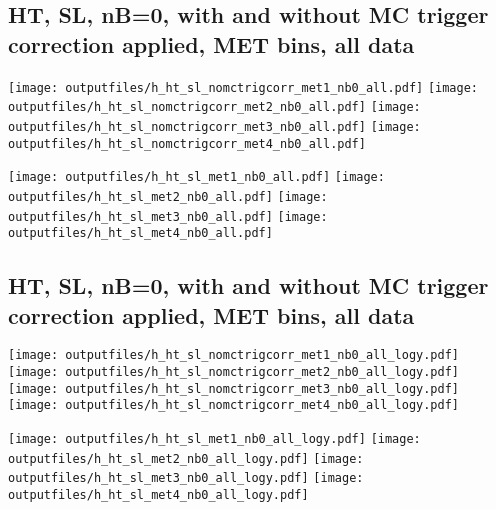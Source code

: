 \documentclass[11pt]{article}
\begin{document}
   \clearpage
     \subsection{ HT, SL, nB=0, with and without MC trigger correction applied, MET bins, all data}

    \noindent
     \texttt{[image: outputfiles/h\_ht\_sl\_nomctrigcorr\_met1\_nb0\_all.pdf]}
     \texttt{[image: outputfiles/h\_ht\_sl\_nomctrigcorr\_met2\_nb0\_all.pdf]}
     \texttt{[image: outputfiles/h\_ht\_sl\_nomctrigcorr\_met3\_nb0\_all.pdf]}
     \texttt{[image: outputfiles/h\_ht\_sl\_nomctrigcorr\_met4\_nb0\_all.pdf]}

    \noindent
     \texttt{[image: outputfiles/h\_ht\_sl\_met1\_nb0\_all.pdf]}
     \texttt{[image: outputfiles/h\_ht\_sl\_met2\_nb0\_all.pdf]}
     \texttt{[image: outputfiles/h\_ht\_sl\_met3\_nb0\_all.pdf]}
     \texttt{[image: outputfiles/h\_ht\_sl\_met4\_nb0\_all.pdf]}

   \clearpage
     \subsection{ HT, SL, nB=0, with and without MC trigger correction applied, MET bins, all data}

    \noindent
     \texttt{[image: outputfiles/h\_ht\_sl\_nomctrigcorr\_met1\_nb0\_all\_logy.pdf]}
     \texttt{[image: outputfiles/h\_ht\_sl\_nomctrigcorr\_met2\_nb0\_all\_logy.pdf]}
     \texttt{[image: outputfiles/h\_ht\_sl\_nomctrigcorr\_met3\_nb0\_all\_logy.pdf]}
     \texttt{[image: outputfiles/h\_ht\_sl\_nomctrigcorr\_met4\_nb0\_all\_logy.pdf]}

    \noindent
     \texttt{[image: outputfiles/h\_ht\_sl\_met1\_nb0\_all\_logy.pdf]}
     \texttt{[image: outputfiles/h\_ht\_sl\_met2\_nb0\_all\_logy.pdf]}
     \texttt{[image: outputfiles/h\_ht\_sl\_met3\_nb0\_all\_logy.pdf]}
     \texttt{[image: outputfiles/h\_ht\_sl\_met4\_nb0\_all\_logy.pdf]}

   \clearpage




\end{document}

